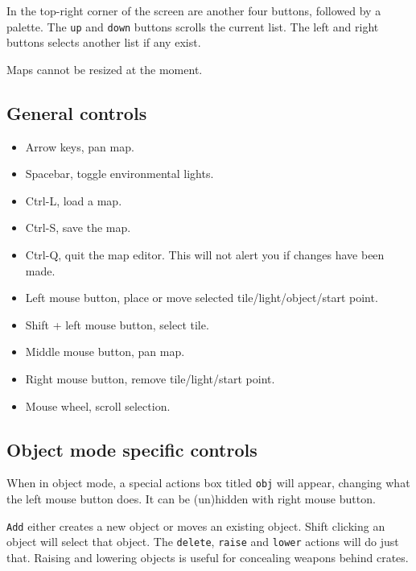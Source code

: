 \documentclass[a4paper]{article}
\begin{document}
In the top-right corner of the screen are another four buttons,
followed by a palette.  The \texttt{up} and \texttt{down} buttons
scrolls the current list.  The left and right buttons selects another
list if any exist.

Maps cannot be resized at the moment.


\subsection{General controls}

\begin{itemize}

\item Arrow keys, pan map.

\item Spacebar, toggle environmental lights.

\item Ctrl-L, load a map.

\item Ctrl-S, save the map.

\item Ctrl-Q, quit the map editor.  This will not alert you if changes have been made.

\item Left mouse button, place or move selected tile/light/object/start point.

\item Shift + left mouse button, select tile.

\item Middle mouse button, pan map.

\item Right mouse button, remove tile/light/start point.

\item Mouse wheel, scroll selection.

\end{itemize}

\subsection{Object mode specific controls}

When in object mode, a special actions box titled \texttt{obj} will
appear, changing what the left mouse button does.  It can be
(un)hidden with right mouse button.

\texttt{Add} either creates a new object or moves an existing object.
Shift clicking an object will select that object.  The
\texttt{delete}, \texttt{raise} and \texttt{lower} actions will do
just that.  Raising and lowering objects is useful for concealing
weapons behind crates.
\end{document}
